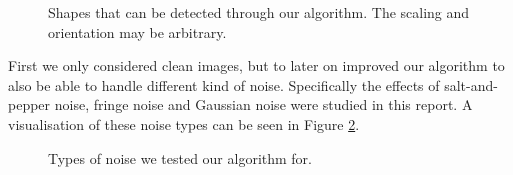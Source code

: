 \documentclass[conference]{IEEEtran}
\begin{document}
\begin{figure}[ht!]%
\centering
{}
\caption{Shapes that can be detected through our algorithm. The scaling and orientation may be arbitrary.}
\label{fig:tranformed_elementary_shapes}
\end{figure}

\noindent
First we only considered clean images, but to later on improved our algorithm to also be
able to handle different kind of noise. Specifically the effects of 
salt-and-pepper noise, fringe noise and
Gaussian noise were studied in this report. A visualisation of these noise types can 
be seen in Figure \ref{fig:types_noise}.
\begin{figure}[ht!]%
\centering
{}
\caption{Types of noise we tested our algorithm for.}
\label{fig:types_noise}
\end{figure}
\end{document}
